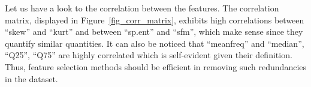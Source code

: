 Let us have a look to the correlation between the features. The correlation matrix, displayed in Figure~\ref{fig_corr_matrix}, exhibits high correlations between ``skew'' and ``kurt'' and between ``sp.ent'' and ``sfm'', which make sense since they quantify similar quantities. It can also be noticed that ``meanfreq'' and ``median'', ``Q25'', ``Q75'' are highly correlated which is self-evident given their definition. 
Thus, feature selection methods should be efficient in removing such redundancies in the dataset.
\newlength{\BoxPlotFigWidth}
\newlength{\BoxPlotFigHeight}
\setlength{\BoxPlotFigWidth}{0.8\textwidth}
